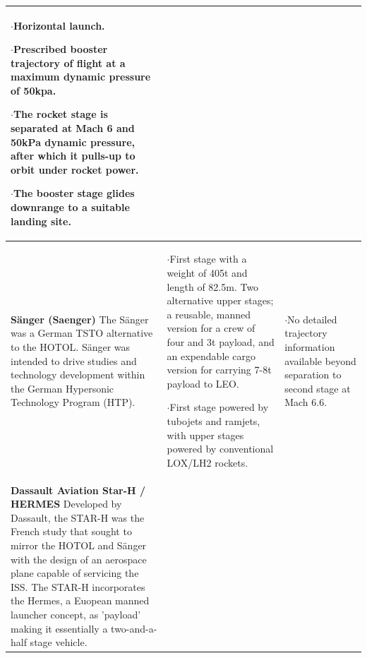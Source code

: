 {\begin{landscape}
\begin{xltabular}{\linewidth}{|X|X|X|}
	$\cdot$Horizontal launch.
	
	$\cdot$Prescribed booster trajectory of flight at a maximum dynamic pressure of 50kpa. 
	
	$\cdot$The rocket stage is separated at Mach 6 and 50kPa dynamic pressure, after which it pulls-up to orbit under rocket power. 
	
	$\cdot$The booster stage glides downrange to a suitable landing site.
	
	
	\\
	\hline \small 
	\textbf{S{\"a}nger (Saenger)}\cite{Aberleen}\newline\newline
	The S{\"a}nger was a German TSTO alternative to the HOTOL. S{\"a}nger was intended to drive studies and technology development within the German Hypersonic Technology Program (HTP). 
	
	
	&\small
	
	$\cdot$First stage with a weight of 405t and length of 82.5m. Two alternative upper stages; a reusable, manned version for a crew of four and 3t payload, and an expendable cargo version for carrying 7-8t payload to LEO. 
	
	$\cdot$First stage powered by tubojets and ramjets, with upper stages powered by conventional LOX/LH2 rockets. 
	
	&\small
	$\cdot$No detailed trajectory information available beyond separation to second stage at Mach 6.6. 
	\\
	\hline \small 
	\textbf{Dassault Aviation Star-H / HERMES} \cite{Aberleen}\newline\newline
Developed by Dassault, the STAR-H was the French study that sought to mirror the HOTOL and S{\"a}nger with the design of an aerospace plane capable of servicing the ISS. The STAR-H incorporates the Hermes, a Euopean manned launcher concept, as 'payload' making it essentially a two-and-a-half stage vehicle. 
	

\end{xltabular}
\end{landscape}}
